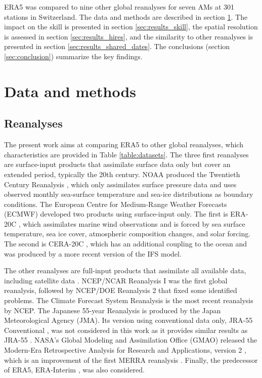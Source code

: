 \documentclass[alpha-refs]{wiley-article}
\begin{document}
ERA5 was compared to nine other global reanalyses for seven AMs at 301 stations in Switzerland. The data and methods are described in section \ref{sec:data_methods}. The impact on the skill is presented in section \ref{sec:results_skill}, the spatial resolution is assessed in section \ref{sec:results_hires}, and the similarity to other reanalyses is presented in section \ref{sec:results_shared_dates}. The conclusions (section \ref{sec:conclusion}) summarize the key findings.


\section{Data and methods}
\label{sec:data_methods}

\subsection{Reanalyses}
\label{sec:reanalyses}

The present work aims at comparing ERA5 \citep{Hersbach2019} to other global reanalyses, which characteristics are provided in Table \ref{table:datasets}. The three first reanalyses are surface-input \citep{Fujiwara2017} products that assimilate surface data only but cover an extended period, typically the 20th century. NOAA produced the Twentieth Century Reanalysis \citep[version 2c, 20CR-2c --][]{Compo2011}, which only assimilates surface pressure data and uses observed monthly sea-surface temperature and sea-ice distributions as boundary conditions. The European Centre for Medium-Range Weather Forecasts (ECMWF) developed two products using surface-input only. The first is ERA-20C \citep{Poli2016}, which assimilates marine wind observations and is forced by sea surface temperature, sea ice cover, atmospheric composition changes, and solar forcing. The second is CERA-20C \citep{Laloyaux2018a}, which has an additional coupling to the ocean and was produced by a more recent version of the IFS model.

The other reanalyses are full-input products that assimilate all available data, including satellite data \citep{Fujiwara2017}. NCEP/NCAR Reanalysis I \citep[NR-1 --][]{Kalnay1996, Kistler2001} was the first global reanalysis, followed by NCEP/DOE Reanalysis 2 \citep[NR-2 --][]{Kanamitsu2002} that fixed some identified problems. The Climate Forecast System Reanalysis \citep[CFSR --][]{Saha2010a} is the most recent reanalysis by NCEP. The Japanese 55-year Reanalysis \citep[JRA-55 --][]{Kobayashi2015, Harada2016} is produced by the Japan Meteorological Agency (JMA). Its version using conventional data only, JRA-55 Conventional \citep[JRA-55C --][]{Kobayashi2014}, was not considered in this work as it provides similar results as JRA-55 \citep{Horton2018b}. NASA's Global Modeling and Assimilation Office (GMAO) released the Modern-Era Retrospective Analysis for Research and Applications, version 2 \citep[MERRA-2 -- ][]{Gelaro2017}, which is an improvement of the first MERRA reanalysis \citep{Rienecker2011}. Finally, the predecessor of ERA5, ERA-Interim \citep[ERA-INT --][]{Dee2011a}, was also considered.
\end{document}
